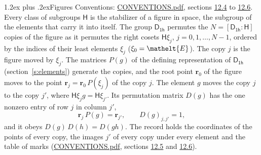 \documentclass[10pt,a4paper]{article}
\makeatletter
\renewcommand\section{\@startsection{section}{1}{\z@}{-3ex plus -1ex minus -.2ex}%
  {1.2ex plus .2ex}{\normalfont\large\sffamily\bfseries\color{parttitle}}}
\numberwithin{equation}{section}
\newcommand{\eltfont}[1]{{\let\sigma\eltsigma\mathelt{#1}}}
\newcommand{\grp}[1]{\mathsf{#1}}
\newcommand{\cls}[1]{\eltfont{#1}}
\newcommand{\pointr}{\mathbf{r}}
\makeatother
\begin{document}
\section{Figures}\label{s:permutation}
Conventions: \href{../../CONVENTIONS.pdf}{CONVENTIONS.pdf}, sections \href{../../CONVENTIONS.pdf\#conv.12.4}{12.4} to \href{../../CONVENTIONS.pdf\#conv.12.6}{12.6}.
Every class of subgroups $\grp{H}$ is the stabilizer of a figure in space, the subgroup of the elements that carry it into itself. \label{n:local.orbit.size}\label{n:element.coset.least}\label{n:index.coset}The group $\grp{D_{1h}}$ permutes the $N = [\grp{D_{1h}} : \grp{H}]$ copies of the figure as it permutes the right cosets $\grp{H}\xi_j$, $j = 0, 1, \dots, N - 1$, ordered by the indices of their least elements $\xi_j$ ($\xi_0 = \cls{E}$). The copy $j$ is the figure moved by $\xi_j$. The matrices $P(g)$ of the defining representation of $\grp{D_{1h}}$ (section~\ref{s:elements}) generate the copies, and the root point $\pointr_0$ of the figure moves to the point $\pointr_j = \pointr_0\, P(\xi_j)$ of the copy $j$. \label{n:local.coset.image}The element $g$ moves the copy $j$ to the copy $j'$, where $\grp{H}\xi_j g = \grp{H}\xi_{j'}$. \label{n:local.matrix.permutation}Its permutation matrix $D(g)$ has the one nonzero entry of row $j$ in column $j'$,
\begin{equation}\label{e:perm.matrix}\pointr_j\, P(g) = \pointr_{j'}, \qquad D(g)_{j,j'} = 1,\end{equation}
and it obeys $D(g)\, D(h) = D(gh)$. The record holds the coordinates of the points of every copy, the images $j'$ of every copy under every element and the table of marks (\href{../../CONVENTIONS.pdf}{CONVENTIONS.pdf}, sections \href{../../CONVENTIONS.pdf\#conv.12.5}{12.5} and \href{../../CONVENTIONS.pdf\#conv.12.6}{12.6}).
\end{document}
